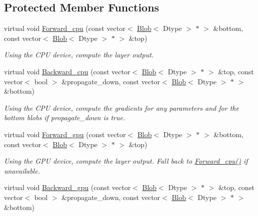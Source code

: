 \subsection*{Protected Member Functions}
\begin{DoxyCompactItemize}
\item 
virtual void \hyperlink{classcaffe_1_1ReshapeLayer_a8fe2fb67597ea0c1c86c9d55ca10026d}{Forward\+\_\+cpu} (const vector$<$ \hyperlink{classcaffe_1_1Blob}{Blob}$<$ Dtype $>$ $\ast$ $>$ \&bottom, const vector$<$ \hyperlink{classcaffe_1_1Blob}{Blob}$<$ Dtype $>$ $\ast$ $>$ \&top)\hypertarget{classcaffe_1_1ReshapeLayer_a8fe2fb67597ea0c1c86c9d55ca10026d}{}\label{classcaffe_1_1ReshapeLayer_a8fe2fb67597ea0c1c86c9d55ca10026d}

\begin{DoxyCompactList}\small\item\em Using the C\+PU device, compute the layer output. \end{DoxyCompactList}\item 
virtual void \hyperlink{classcaffe_1_1ReshapeLayer_af2af482e9fa1c06c03359c8cfc78a7a2}{Backward\+\_\+cpu} (const vector$<$ \hyperlink{classcaffe_1_1Blob}{Blob}$<$ Dtype $>$ $\ast$ $>$ \&top, const vector$<$ bool $>$ \&propagate\+\_\+down, const vector$<$ \hyperlink{classcaffe_1_1Blob}{Blob}$<$ Dtype $>$ $\ast$ $>$ \&bottom)\hypertarget{classcaffe_1_1ReshapeLayer_af2af482e9fa1c06c03359c8cfc78a7a2}{}\label{classcaffe_1_1ReshapeLayer_af2af482e9fa1c06c03359c8cfc78a7a2}

\begin{DoxyCompactList}\small\item\em Using the C\+PU device, compute the gradients for any parameters and for the bottom blobs if propagate\+\_\+down is true. \end{DoxyCompactList}\item 
virtual void \hyperlink{classcaffe_1_1ReshapeLayer_a52fa50275777353d783c0bd406104d6b}{Forward\+\_\+gpu} (const vector$<$ \hyperlink{classcaffe_1_1Blob}{Blob}$<$ Dtype $>$ $\ast$ $>$ \&bottom, const vector$<$ \hyperlink{classcaffe_1_1Blob}{Blob}$<$ Dtype $>$ $\ast$ $>$ \&top)\hypertarget{classcaffe_1_1ReshapeLayer_a52fa50275777353d783c0bd406104d6b}{}\label{classcaffe_1_1ReshapeLayer_a52fa50275777353d783c0bd406104d6b}

\begin{DoxyCompactList}\small\item\em Using the G\+PU device, compute the layer output. Fall back to \hyperlink{classcaffe_1_1ReshapeLayer_a8fe2fb67597ea0c1c86c9d55ca10026d}{Forward\+\_\+cpu()} if unavailable. \end{DoxyCompactList}\item 
virtual void \hyperlink{classcaffe_1_1ReshapeLayer_ad968c53c0029282e66623fd1eca3191a}{Backward\+\_\+gpu} (const vector$<$ \hyperlink{classcaffe_1_1Blob}{Blob}$<$ Dtype $>$ $\ast$ $>$ \&top, const vector$<$ bool $>$ \&propagate\+\_\+down, const vector$<$ \hyperlink{classcaffe_1_1Blob}{Blob}$<$ Dtype $>$ $\ast$ $>$ \&bottom)\hypertarget{classcaffe_1_1ReshapeLayer_ad968c53c0029282e66623fd1eca3191a}{}\label{classcaffe_1_1ReshapeLayer_ad968c53c0029282e66623fd1eca3191a}


\end{DoxyCompactItemize}

